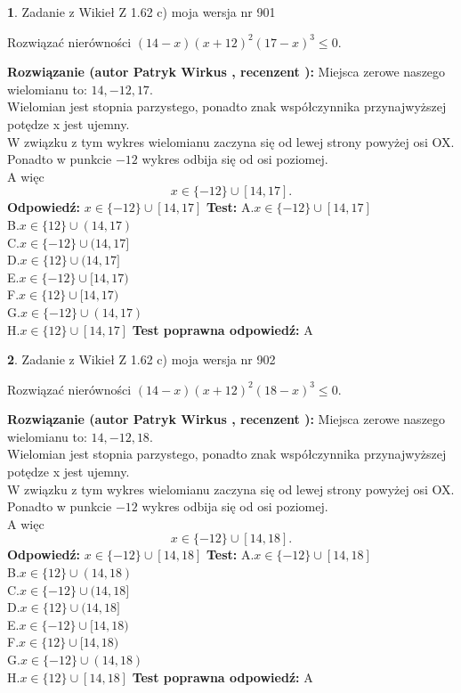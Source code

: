 \documentclass[12pt, a4paper]{article}
\theoremstyle{definition} %
\newtheorem{zad}{}
\newcommand{\zadStart}[1]{\begin{zad}#1\newline}
\newcommand{\zadStop}{\end{zad}}
\newcommand{\rozwStart}[2]{\noindent \textbf{Rozwiązanie (autor #1 , recenzent #2): }\newline}
\newcommand{\rozwStop}{\newline}
\newcommand{\odpStart}{\noindent \textbf{Odpowiedź:}\newline}
\newcommand{\odpStop}{\newline}
\newcommand{\testStart}{\noindent \textbf{Test:}\newline}
\newcommand{\testStop}{\newline}
\newcommand{\kluczStart}{\noindent \textbf{Test poprawna odpowiedź:}\newline}
\newcommand{\kluczStop}{\newline}
\begin{document}
\zadStart{Zadanie z Wikieł Z 1.62 c) moja wersja nr 901}

Rozwiązać nierówności $(14-x)(x+12)^{2}(17-x)^{3}\le0$.
\zadStop
\rozwStart{Patryk Wirkus}{}
Miejsca zerowe naszego wielomianu to: $14, -12, 17$.\\
Wielomian jest stopnia parzystego, ponadto znak współczynnika przy\linebreak najwyższej potędze x jest ujemny.\\ W związku z tym wykres wielomianu zaczyna się od lewej strony powyżej osi OX.\\
Ponadto w punkcie $-12$ wykres odbija się od osi poziomej.\\
A więc $$x \in \{-12\} \cup [14,17].$$
\rozwStop
\odpStart
$x \in \{-12\} \cup [14,17]$
\odpStop
\testStart
A.$x \in \{-12\} \cup [14,17]$\\
B.$x \in \{12\} \cup (14,17)$\\
C.$x \in \{-12\} \cup (14,17]$\\
D.$x \in \{12\} \cup (14,17]$\\
E.$x \in \{-12\} \cup [14,17)$\\
F.$x \in \{12\} \cup [14,17)$\\
G.$x \in \{-12\} \cup (14,17)$\\
H.$x \in \{12\} \cup [14,17]$
\testStop
\kluczStart
A
\kluczStop



\zadStart{Zadanie z Wikieł Z 1.62 c) moja wersja nr 902}

Rozwiązać nierówności $(14-x)(x+12)^{2}(18-x)^{3}\le0$.
\zadStop
\rozwStart{Patryk Wirkus}{}
Miejsca zerowe naszego wielomianu to: $14, -12, 18$.\\
Wielomian jest stopnia parzystego, ponadto znak współczynnika przy\linebreak najwyższej potędze x jest ujemny.\\ W związku z tym wykres wielomianu zaczyna się od lewej strony powyżej osi OX.\\
Ponadto w punkcie $-12$ wykres odbija się od osi poziomej.\\
A więc $$x \in \{-12\} \cup [14,18].$$
\rozwStop
\odpStart
$x \in \{-12\} \cup [14,18]$
\odpStop
\testStart
A.$x \in \{-12\} \cup [14,18]$\\
B.$x \in \{12\} \cup (14,18)$\\
C.$x \in \{-12\} \cup (14,18]$\\
D.$x \in \{12\} \cup (14,18]$\\
E.$x \in \{-12\} \cup [14,18)$\\
F.$x \in \{12\} \cup [14,18)$\\
G.$x \in \{-12\} \cup (14,18)$\\
H.$x \in \{12\} \cup [14,18]$
\testStop
\kluczStart
A
\kluczStop
\end{document}

